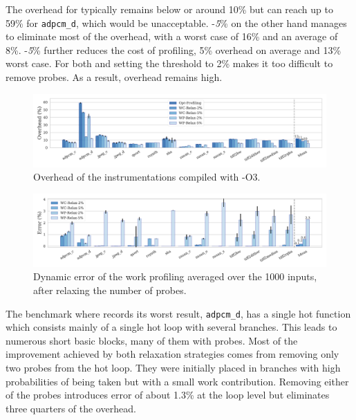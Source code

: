 
The overhead for \OptProf typically remains below or around 10\% but can reach up to 59\% for \texttt{adpcm\_d}, which would be
unacceptable. \WCRelax-\textit{5}\% on the other hand manages to eliminate most of the overhead, with a worst
case of 16\% and an average of 8\%. \WPRelax-\textit{5}\% further reduces the cost of profiling, 5\% overhead on average and 13\%
worst case. For both \WCRelax and \WPRelax setting the threshold to 2\% makes it too difficult to remove probes. As a result, overhead
remains high.

\begin{figure}[t!]
    \centering
    \includegraphics[width=\textwidth]{figs/overhead-O3.pdf}
    \caption{Overhead of the instrumentations compiled with {\flagstype -O3}.}
    \label{fig:overhead-O3}
\end{figure}
\begin{figure}[t!]
    \centering
    \includegraphics[width=\textwidth]{figs/error-O3.pdf}
    \caption{Dynamic error of the work profiling averaged over the 1000 inputs, after relaxing the number of probes.}
    \label{fig:error-O3}
\end{figure}


The benchmark where \OptProf records its worst result, \texttt{adpcm\_d}, has a single hot function which consists mainly of a single hot
loop with several branches. This leads to numerous short basic blocks, many of them with probes. Most of the improvement achieved by both
relaxation strategies comes from removing only two probes from the hot loop. They were initially placed in branches with high probabilities
of being taken but with a small work contribution. Removing either of the probes introduces error of about 1.3\% at the loop level but
eliminates three quarters of the overhead.

